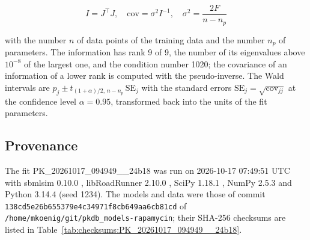 \documentclass{article}
\begin{document}
\begin{equation}
I = J^\top J, \quad \mathrm{cov} = \sigma^2 I^{-1}, \quad \sigma^2 = \frac{2 F}{n - n_p}
\end{equation}

with the number $n$ of data points of the training data and the number $n_p$ of parameters. The information has rank 9 of 9, the number of its eigenvalues above $10^{-8}$ of the largest one, and the condition number 1020; the covariance of an information of a lower rank is computed with the pseudo-inverse. The Wald intervals are $\hat{p}_j \pm t_{(1+\alpha)/2,\, n-n_p}\, \mathrm{SE}_j$ with the standard errors $\mathrm{SE}_j = \sqrt{\mathrm{cov}_{jj}}$ at the confidence level $\alpha = 0.95$, transformed back into the units of the fit parameters.

\subsection{Provenance}

The fit PK\_20261017\_094949\_\_24b18 was run on 2026-10-17 07:49:51 UTC with sbmlsim 0.10.0 \cite{Koenig2026_sbmlsim}, libRoadRunner 2.10.0 \cite{Welsh2023}, SciPy 1.18.1 \cite{Virtanen2020}, NumPy 2.5.3 \cite{Harris2020} and Python 3.14.4 (seed 1234). The models and data were those of commit \texttt{138cd5e26b655379e4c34971f8cb649aa6cb81cd} of \texttt{/home/mkoenig/git/pkdb\_models-rapamycin}; their SHA-256 checksums are listed in Table~\ref{tab:checksums:PK_20261017_094949__24b18}.
\end{document}
